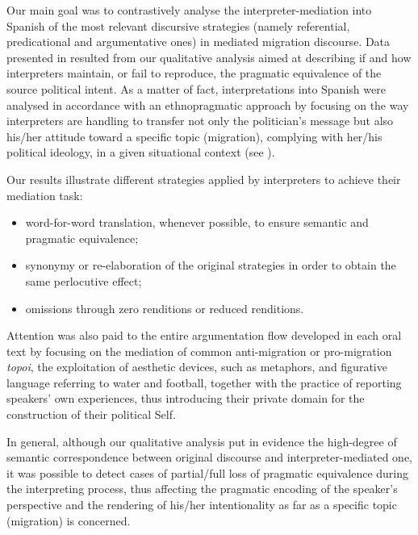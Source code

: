 \documentclass[output=paper]{langscibook}
\begin{document}
Our main goal was to contrastively analyse the interpreter-mediation into Spanish of the most relevant discursive strategies (namely referential, predicational and argumentative ones) in mediated migration discourse. Data presented in  resulted from our qualitative analysis aimed at describing if and how interpreters maintain, or fail to reproduce, the pragmatic equivalence of the source political intent. As a matter of fact, interpretations into Spanish were analysed in accordance with an ethnopragmatic approach by focusing on the way interpreters are handling to transfer not only the politician’s message but also his/her attitude toward a specific topic (migration), complying with her/his political ideology, in a given situational context (see \citealt{BuelowMoeller2003}).

Our results illustrate different strategies applied by interpreters to achieve their mediation task:

\begin{itemize}\sloppy
\item word-for-word translation, whenever possible, to ensure semantic and pragmatic equivalence;
\item synonymy or re-elaboration of the original strategies in order to obtain the same perlocutive effect;
\item omissions through zero renditions or reduced renditions.
\end{itemize}

Attention was also paid to the entire argumentation flow developed in each oral text by focusing on the mediation of common anti-migration or pro-mi\-gra\-tion \textit{topoi}, the exploitation of aesthetic devices, such as metaphors, and figurative language referring to water and football, together with the practice of reporting speakers’ own experiences, thus introducing their private domain for the construction of their political Self.

In general, although our qualitative analysis put in evidence the high-degree of semantic correspondence between original discourse and interpreter-mediated one, it was possible to detect cases of partial/full loss of pragmatic equivalence during the interpreting process, thus affecting the pragmatic encoding of the speaker’s perspective and the rendering of his/her intentionality as far as a specific topic (migration) is concerned.
\end{document}
